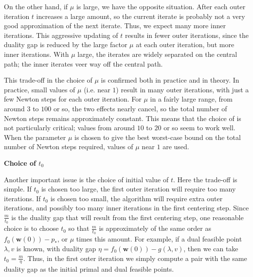 \documentclass{beamer}
\begin{document}
\begin{frame}

\justifying
On the other hand, if $\mu$ is large, we have the opposite situation. After each outer iteration $t$ increases a large amount, so the current iterate is probably not a very good approximation of the next iterate. Thus, we expect many more inner iterations. This aggressive updating of $t$ results in fewer outer iterations, since the duality gap is reduced by the large factor $\mu$ at each outer iteration, but more inner iterations. With $\mu$ large, the iterates are widely separated on the central path; the inner iterates veer way off the central path.

\vspace{0.4cm}
\justifying
This trade-off in the choice of $\mu$ is confirmed both in practice and in theory. In practice, small values of $\mu$ (i.e. near $1$) result in many outer iterations, with just a few Newton steps for each outer iteration. For $\mu$ in a fairly large range, from around $3$ to $100$ or so, the two effects nearly cancel, so the total number of Newton steps remains approximately constant. This means that the choice of is not particularly critical; values from around $10$ to $20$ or so seem to work well. When the parameter $\mu$ is chosen to give the best worst-case bound on the total number of Newton steps required, values of $\mu$ near $1$ are used.

\end{frame}



\begin{frame}

\textbf{Choice of $t_{0}$}

\vspace{0.4cm}
\justifying
Another important issue is the choice of initial value of $t$. Here the trade-off is simple. If $t_{0}$ is chosen too large, the first outer iteration will require too many iterations. If $t_{0}$ is chosen too small, the algorithm will require extra outer iterations, and possibly too many inner iterations in the first centering step. Since $\frac{m}{t_{0}}$ is the duality gap that will result from the first centering step, one reasonable choice is to choose $t_{0}$ so that $\frac{m}{t_{0}}$ is approximately of the same order as $f_{0}\left(\mathbf{w}\left(0\right)\right) - p_{*}$, or $\mu$ times this amount. For example, if a dual feasible point $\lambda, v$ is known, with duality gap $ \eta = f_{0}\left(\mathbf{w}\left(0\right)\right) - g\left(\lambda,v\right)$, then we can take $t_{0} = \frac{m}{\eta}$. Thus, in the first outer iteration we simply compute a pair with the same duality gap as the initial primal and dual feasible points.



\end{frame}
\end{document}
